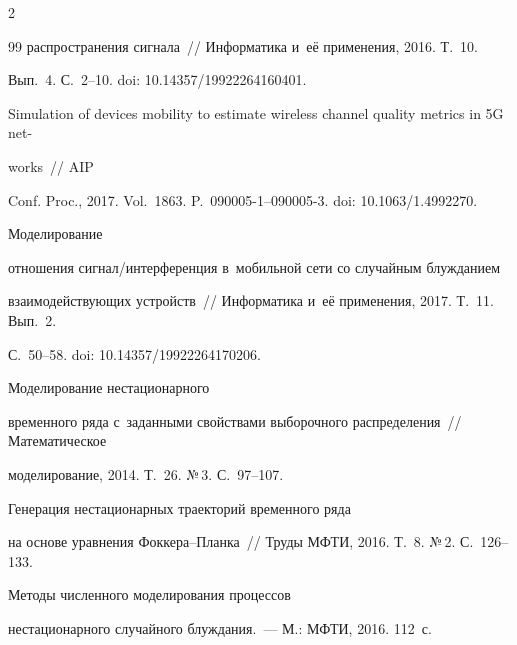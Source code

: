 \begin{multicols}{2}
{{\begin{thebibliography}{99}
распространения сигнала~// Информатика и~её применения, 2016. Т.~10. 


Вып.~4. С.~2--10. doi:  10.14357/19922264160401.






Simulation of devices mobility to estimate wireless channel quality metrics in 5G net-\linebreak\vspace*{-12pt}





\pagebreak





\noindent


works~// AIP 


Conf. Proc., 2017. Vol.~1863. P.~090005-1--090005-3. doi: 10.1063/1.4992270.




 Моделирование 


отношения сигнал/ин\-тер\-фе\-рен\-ция в~мобильной сети со случайным блуж\-да\-ни\-ем 


взаимодействующих устройств~// Информатика и~её применения, 2017. Т.~11. Вып.~2. 


С.~50--58. doi:  10.14357/19922264170206.




 Мо\-де\-ли\-рование нестационарного 


временного ряда с~за\-данными свойствами выборочного распределения~// Математическое 


моделирование, 2014. Т.~26. №\,3. С.~97--107.




 Генерация нестационарных траекторий временного ряда 


на основе уравнения Фок\-ке\-ра--План\-ка~// Труды МФТИ, 2016. Т.~8. №\,2. С.~126--133.




 Методы численного моделирования процессов 


нестационарного случайного блуждания.~--- М.: МФТИ, 2016. 112~с.



\end{thebibliography}}}
\end{multicols}
